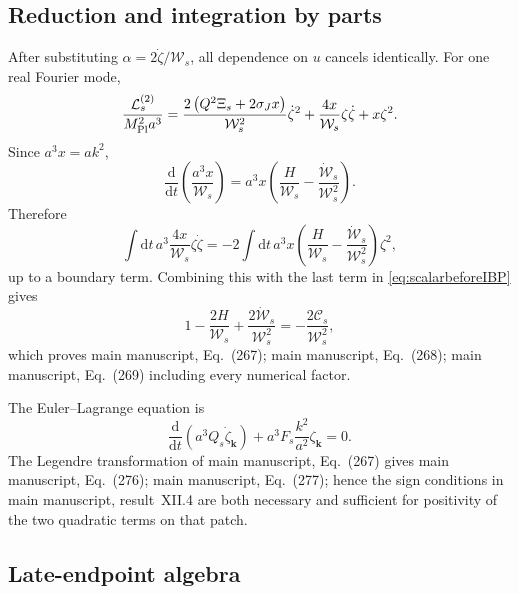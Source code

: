 \documentclass[aps,prd,reprint,onecolumn,notitlepage,nofootinbib,longbibliography,floatfix]{revtex4-2}
\theoremstyle{scstyle}
\theoremstyle{definition}
\theoremstyle{remark}
\newcommand{\dd}{\mathrm{d}}
\newcommand{\mpl}{M_{\rm Pl}}
\begin{document}
\subsection{Reduction and integration by parts}

After substituting $\alpha=2\dot\zeta/\mathcal W_s$, all dependence on $u$ cancels identically. For one real Fourier mode,
\begin{equation}
\frac{\mathcal L_s^{(2)}}{\mpl^2a^3}
=\frac{2\left(Q^2\Xi_s+2\sigma_Jx\right)}{\mathcal W_s^2}\dot\zeta^2
+\frac{4x}{\mathcal W_s}\zeta\dot\zeta+x\zeta^2.
\label{eq:scalarbeforeIBP}
\end{equation}
Since $a^3x=ak^2$,
\begin{equation}
\frac{\dd}{\dd t}\left(\frac{a^3x}{\mathcal W_s}\right)
=a^3x\left(\frac{H}{\mathcal W_s}
-\frac{\dot{\mathcal W}_s}{\mathcal W_s^2}\right).
\label{eq:scalarIBPidentity}
\end{equation}
Therefore
\begin{equation}
\int\dd t\,a^3\frac{4x}{\mathcal W_s}\zeta\dot\zeta
=-2\int\dd t\,a^3x
\left(\frac{H}{\mathcal W_s}
-\frac{\dot{\mathcal W}_s}{\mathcal W_s^2}\right)\zeta^2,
\label{eq:scalarcrossIBP}
\end{equation}
up to a boundary term. Combining this with the last term in \cref{eq:scalarbeforeIBP} gives
\begin{equation}
1-\frac{2H}{\mathcal W_s}
+\frac{2\dot{\mathcal W}_s}{\mathcal W_s^2}
=-\frac{2\mathcal C_s}{\mathcal W_s^2},
\label{eq:Csidentity}
\end{equation}
which proves main manuscript, Eq.~(267); main manuscript, Eq.~(268); main manuscript, Eq.~(269) including every numerical factor.

The Euler--Lagrange equation is
\begin{equation}
\frac{\dd}{\dd t}\left(a^3Q_s\dot\zeta_{\bm k}\right)
+a^3F_s\frac{k^2}{a^2}\zeta_{\bm k}=0.
\label{eq:scalarEOMexact}
\end{equation}
The Legendre transformation of main manuscript, Eq.~(267) gives main manuscript, Eq.~(276); main manuscript, Eq.~(277); hence the sign conditions in main manuscript, result~XII.4 are both necessary and sufficient for positivity of the two quadratic terms on that patch.

\subsection{Late-endpoint algebra}
\end{document}
